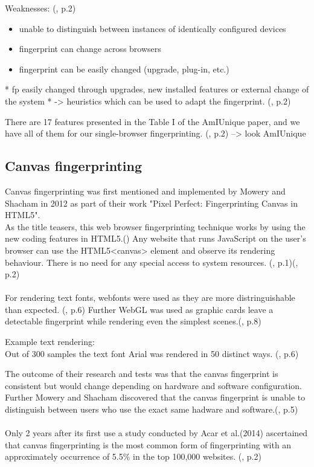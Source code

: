 Weaknesses: (\textcite{upi15}, p.2)
\begin{itemize}
	\item unable to distinguish between instances of identically configured devices
	\item fingerprint can change across browsers
	\item fingerprint can be easily changed (upgrade, plug-in, etc.)
\end{itemize}
* fp easily changed through upgrades, new installed features or external change of the system 
* -> heuristics which can be used to adapt the fingerprint.  (\textcite{upi15}, p.2)

There are 17 features presented in the Table I of the AmIUnique paper,
and we have all of them for our single-browser fingerprinting.
(\textcite{Cao17}, p.2)
--> look AmIUnique

\subsection{Canvas fingerprinting}
Canvas fingerprinting was first mentioned and implemented by Mowery and Shacham in 2012 as part of their work "Pixel Perfect: Fingerprinting Canvas in HTML5".\\
As the title teasers, this web browser fingerprinting technique works by using the new coding features in HTML5.(\textcite{pixel18}) Any website that runs JavaScript on the user's browser can use the HTML5<canvas> element and observe its rendering behaviour. There is no need for any special access to system resources. (\textcite{mowery12}, p.1)(\textcite{upi15}, p.2)\\\\
For rendering text fonts, webfonts were used as they are more distringuishable than expected. (\textcite{mowery12}, p.6) Further WebGL was used as  graphic cards leave a detectable fingerprint while rendering even the simplest scenes.(\textcite{mowery12}, p.8)\\
\begin{tcolorbox}
	Example text rendering: \\
	Out of 300 samples the text font Arial was rendered in 50 distinct ways. (\textcite{mowery12}, p.6)
\end{tcolorbox}
The outcome of their research and tests was that the canvas fingerprint is consistent but would change depending on hardware and software configuration. Further Mowery and Shacham discovered that the canvas fingerprint is unable to distinguish between users who use the exact same hadware and software.(\textcite{mowery12}, p.5)\\\\
Only 2 years after its first use a study conducted by Acar et al.(2014) ascertained that canvas fingerprinting is the most common form of fingerprinting with an approximately occurrence of 5.5\% in the top 100,000 websites. (\textcite{upi15}, p.2)

